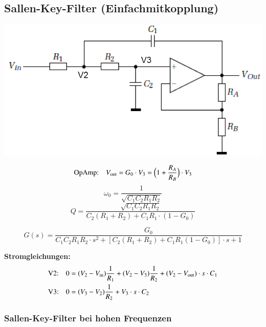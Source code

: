 
\subsection{Sallen-Key-Filter (Einfachmitkopplung)}

\begin{minipage}[c]{0.4\columnwidth}
    \includegraphics[width=\columnwidth]{images/sallen_key.png}
\end{minipage}
\hfill
\begin{minipage}[c]{0.58\columnwidth}
    $$ \text{OpAmp:} \quad  V_{\rm out} = G_0 \cdot V_3 = \Big(1 + \frac{R_A}{R_B} \Big) \cdot V_3 $$
    $$ \omega_0 = \frac{1}{\sqrt{C_1 C_2 R_1 R_2}} $$
    $$ Q = \frac{\sqrt{C_1 C_2 R_1 R_2}}{ C_2 (R_1 + R_2) + C_1 R_1 \cdot (1 - G_0)} $$
\end{minipage}

$$ \boxed{ G(s) = \frac{G_0}{ C_1 C_2 R_1 R_2 \cdot s^2 + [ C_2 (R_1 + R_2) + C_1 R_1 (1 - G_0) ] \cdot s + 1} } $$

\textbf{Stromgleichungen:}
\begin{align*}
    \text{V2:} \quad 0 &= (V_2 - V_{\rm in}) \frac{1}{R_1} + (V_2 - V_3) \frac{1}{R_2} + (V_2 - V_{\rm out}) \cdot s \cdot C_1  \\
    \text{V3:} \quad 0 &= (V_3 - V_2) \frac{1}{R_2} + V_3  \cdot s \cdot C_2 
\end{align*}


\subsubsection{Sallen-Key-Filter bei hohen Frequenzen}

